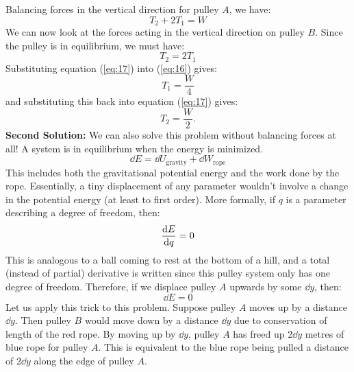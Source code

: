 \documentclass{article}
\begin{document}
Balancing forces in the vertical direction for pulley $A$, we have:
\begin{equation}
    T_2+2T_1=W
    \label{eq:16}
\end{equation}
We can now look at the forces acting in the vertical direction on pulley $B$. Since the pulley is in equilibrium, we must have:
\begin{equation}
    T_2=2T_1
    \label{eq:17}
\end{equation}
Substituting equation (\ref{eq:17}) into (\ref{eq:16}) gives:
\begin{equation}
    \boxed{T_1=\frac{W}{4}}
    \label{eq:}
\end{equation}
and substituting this back into equation (\ref{eq:17}) gives:
\begin{equation}
    \boxed{T_2 = \frac{W}{2}.}
\end{equation}
\textbf{Second Solution:} We can also solve this problem without balancing forces at all! A system is in equilibrium when the energy is minimized.
\begin{equation}
    \dd{E} = \dd{U_\text{gravity}}+\dd{W_\text{rope}}
    \label{eq:}
\end{equation}
This includes both the gravitational potential energy and the work done by the rope. Essentially, a tiny displacement of any parameter wouldn't involve a change in the potential energy (at least to first order). More formally, if $q$ is a parameter describing a degree of freedom, then:
\begin{equation}
    \dv{E}{q} = 0
    \label{eq:}
\end{equation}
This is analogous to a ball coming to rest at the bottom of a hill, and a total (instead of partial) derivative is written since this pulley system only has one degree of freedom. Therefore, if we displace pulley $A$ upwards by some $\dd{y}$, then: 
\begin{equation}
    \dd{E}=0
    \label{eq:22}
\end{equation}
Let us apply this trick to this problem. Suppose pulley $A$ moves up by a distance $\dd{y}$. Then pulley $B$ would move down by a distance $\dd{y}$ due to conservation of length of the red rope. By moving up by $\dd{y}$, pulley $A$ has freed up $2\dd{y}$ metres of blue rope for pulley $A$. This is equivalent to the blue rope being pulled a distance of $2\dd{y}$ along the edge of pulley $A$.
\end{document}
